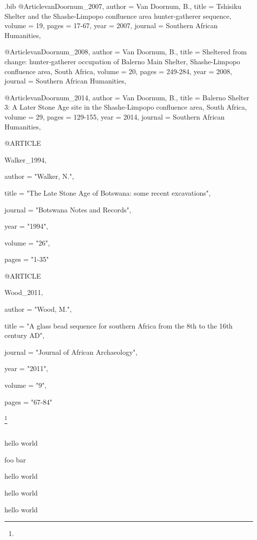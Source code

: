 \begin{filecontents}{\identifier.bib}
@Article{vanDoornum_2007,
  author  = {Van Doornum, B.},
  title   = {Tshisiku Shelter and the Shashe-Limpopo confluence area hunter-gatherer sequence},
  volume  = {19},
  pages   = {17-67},
  year    = {2007},
  journal = {Southern African Humanities},
}

@Article{vanDoornum_2008,
  author  = {Van Doornum, B.},
  title   = {Sheltered from change: hunter-gatherer occupation of Balerno Main Shelter, Shashe-Limpopo confluence area, South Africa},
  volume  = {20},
  pages   = {249-284},
  year    = {2008},
  journal = {Southern African Humanities},
}

@Article{vanDoornum_2014,
  author  = {Van Doornum, B.},
  title   = {Balerno Shelter 3: A Later Stone Age site in the Shashe-Limpopo confluence area, South Africa},
  volume  = {29},
  pages   = {129-155},
  year    = {2014},
  journal = {Southern African Humanities},
}


@ARTICLE {Walker_1994,

author  = "Walker, N.",

title   = "The Late Stone Age of Botswana: some recent excavations",

journal = "Botswana Notes and Records",

year    = "1994",

volume  = "26",

pages   = "1-35"

}


@ARTICLE {Wood_2011,

author  = "Wood, M.",

title   = "A glass bead sequence for southern Africa from the 8th to the 16th century AD",

journal = "Journal of African Archaeology",

year    = "2011",

volume  = "9",

pages   = "67-84"
}

\end{filecontents}


\openingarticle

	{\Large\scshape
	\shortauthor\footnote{\thanknote}}\\[1em]
	\email\\
	\affiliation

\midarticle

\begin{myabstract}%

\keywords{}
\end{myabstract}


hello world
\clearpage

foo bar


hello world
\newpage



hello world
\newpage



hello world
\cite{Wood_2011,Alexander_1984,vanDoornum_2014,vanDoornum_2005,Reid_1998,Schoeman_2006,vanDoornum_2008,Walker_1994,Deacon_1984a,vanDoornum_2007}
\closingarticle
